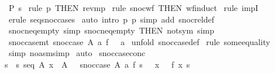 \begin{isabellebody}
\ {\isachardoublequoteopen}P\ s{\isachardoublequoteclose}\isanewline
%
\isadelimproof
%
\endisadelimproof
%
\isatagproof
{}\isamarkupfalse%
\ {\isacharparenleft}rule\ p{}\ {\isacharbrackleft}THEN\ rev{\isacharunderscore}mp{\isacharbrackright}{\isacharparenright}\isanewline
{}\isamarkupfalse%
\ {\isacharparenleft}rule\ snoc{\isacharunderscore}wf\ {\isacharbrackleft}THEN\ wf{\isacharunderscore}induct{\isacharbrackright}{\isacharparenright}\isanewline
{}\isamarkupfalse%
\ {\isacharparenleft}rule\ impI{\isacharparenright}\isanewline
{}\isamarkupfalse%
\ {\isacharparenleft}erule\ seqsnoc{\isacharunderscore}cases{\isacharparenright}\isanewline
{}\isamarkupfalse%
\ {\isacharparenleft}auto\ intro{\isacharbang}{\isacharcolon}\ p{}\ p{}\ simp\ add{\isacharcolon}\ snoc{\isacharunderscore}rel{\isacharunderscore}def{\isacharparenright}\isanewline
{}\isamarkupfalse%
%
\endisatagproof
{\isafoldproof}%
%
\isadelimproof
\isanewline
%
\endisadelimproof
\isanewline
\isanewline
\isanewline
{}\isamarkupfalse%
\ snoc{\isacharunderscore}neq{\isacharunderscore}empty\ {\isacharbrackleft}simp{\isacharbrackright}\ snoc{\isacharunderscore}neq{\isacharunderscore}empty\ {\isacharbrackleft}THEN\ not{\isacharunderscore}sym{\isacharcomma}\ simp{\isacharbrackright}\isanewline
\isanewline
\isanewline
{}\isamarkupfalse%
\ snoc{\isacharunderscore}case{\isacharunderscore}mt{\isacharcolon}\ {\isachardoublequoteopen}snoc{\isacharunderscore}case\ A\ a\ f\ {\isacharpercent}{\isacharless}{\isacharpercent}{\isachargreater}\ {\isacharequal}\ a{\isachardoublequoteclose}\isanewline
%
\isadelimproof
%
\endisadelimproof
%
\isatagproof
{}\isamarkupfalse%
\ {\isacharparenleft}unfold\ snoc{\isacharunderscore}case{\isacharunderscore}def{\isacharparenright}\isanewline
{}\isamarkupfalse%
\ {\isacharparenleft}rule\ some{\isacharunderscore}equality{\isacharparenright}\isanewline
{}\isamarkupfalse%
\ {\isacharparenleft}simp\ {\isacharparenleft}no{\isacharunderscore}asm{\isacharunderscore}simp{\isacharparenright}{\isacharparenright}\isanewline
{}\isamarkupfalse%
\ auto\isanewline
{}\isamarkupfalse%
%
\endisatagproof
{\isafoldproof}%
%
\isadelimproof
\isanewline
%
\endisadelimproof
\isanewline
\isanewline
{}\isamarkupfalse%
\ snoc{\isacharunderscore}case{\isacharunderscore}conc{\isacharcolon}\ \isanewline
{\isachardoublequoteopen}{\isacharbang}{\isacharbang}s{\isachardot}\ {\isacharbrackleft}{\isacharbar}\ s{\isacharcolon}\ seq\ A{\isacharsemicolon}\ x\ {\isacharcolon}\ A\ {\isacharbar}{\isacharbrackright}\ {\isacharequal}{\isacharequal}{\isachargreater}\ snoc{\isacharunderscore}case\ A\ a\ f\ {\isacharparenleft}s\ {\isacharpercent}{\isacharampersand}{\isacharcircum}\ {\isacharpercent}{\isacharless}\ x\ {\isacharpercent}{\isachargreater}{\isacharparenright}\ {\isacharequal}\ f\ x\ s{\isachardoublequoteclose}\isanewline

\end{isabellebody}
